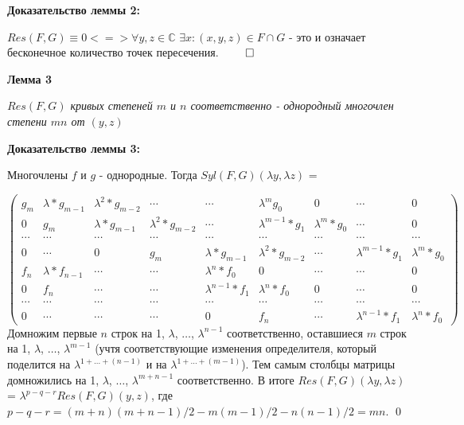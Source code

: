 \documentclass[a4paper, 12pt]{article}
\begin{document}
\textbf{Доказательство леммы 2:}

$Res(F,G) \equiv 0 <=> \forall y,z \in \mathbb{C}$ $\exists x: (x,y,z) \in F \cap G$ - это и означает бесконечное количество точек пересечения. $\qed$

\textbf{Лемма 3}

\textit{$Res(F,G)$ кривых степеней $m$ и $n$ соответственно - однородный многочлен степени $mn$ от $(y,z)$}

\textbf{Доказательство леммы 3:}

Многочлены $f$ и $g$ - однородные.
Тогда $Syl(F,G)(\lambda y,\lambda z)$ =

$\begin{pmatrix}
g_m & \lambda*g_{m-1} & \lambda^{2}*g_{m-2} & \cdots & \cdots & \lambda^{m}g_0 & 0 & \cdots & 0 \\
0 & g_m & \lambda*g_{m-1} & \lambda^{2}*g_{m-2} & \cdots & \lambda^{m-1}*g_1 & \lambda^{m}*g_0 & \cdots & 0 \\
\cdots & \cdots & \cdots & \cdots & \cdots & \cdots & \cdots & \cdots & \cdots \\
0 & \cdots & 0 & g_m & \lambda*g_{m-1} & \lambda^{2}*g_{m-2} & \cdots & \lambda^{m-1}*g_1 & \lambda^{m}*g_0 \\
f_n & \lambda*f_{n-1} & \cdots & \cdots & \lambda^{n}*f_0 & 0 & \cdots & \cdots & 0 \\
0 & f_n & \cdots & \cdots & \lambda^{n-1}*f_1 & \lambda^{n}*f_0 & 0 & \cdots & 0 \\
\cdots & \cdots & \cdots & \cdots & \cdots & \cdots & \cdots & \cdots & \cdots \\
0 & \cdots & \cdots & \cdots & 0 & f_n & \cdots & \lambda^{n-1}*f_1 & \lambda^{n}*f_0
\end{pmatrix}$
\smallskip
Домножим первые $n$ строк на 1, $\lambda$, $\dots$, $\lambda^{n-1}$ соответственно, оставшиеся $m$ строк на 1, $\lambda$, $\dots$, $\lambda^{m-1}$ (учтя соответствующие изменения определителя, который поделится на $\lambda^{1 +\dots + (n-1)}$ и на $\lambda^{1 +\dots + (m-1)}$).
Тем самым столбцы матрицы домножились на 1, $\lambda$, $\dots$, $\lambda^{m + n - 1}$ соответственно.\newline
В итоге $Res(F,G)(\lambda y,\lambda z)$ = $\lambda^{p-q-r}Res(F,G)(y,z)$, где $p - q - r = (m+n)(m+n-1)/2 - m(m-1)/2 - n(n-1)/2 = mn$.
\qed
\end{document}
